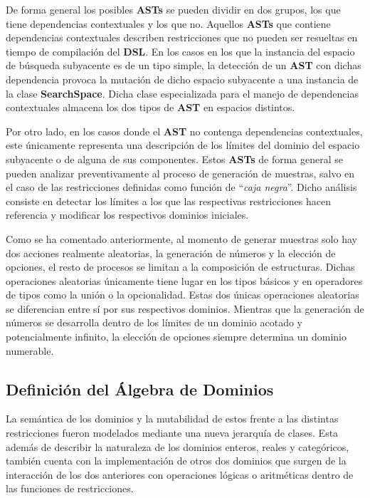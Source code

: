 De forma general los posibles {\bf ASTs} se pueden dividir en dos grupos, los que tiene dependencias contextuales
y los que no. Aquellos {\bf ASTs} que contiene dependencias contextuales describen restricciones que no pueden ser
resueltas en tiempo de compilación del {\bf DSL}. En los casos en los que la instancia del espacio de búsqueda subyacente
es de un tipo simple, la detección de un {\bf AST }con dichas dependencia provoca la mutación de dicho espacio subyacente
a una instancia de la clase {\bf SearchSpace}. Dicha clase especializada para el manejo de dependencias contextuales
almacena los dos tipos de {\bf AST} en espacios distintos.

Por otro lado, en los casos donde el {\bf AST} no contenga dependencias contextuales, este únicamente representa una
descripción de los límites del dominio del espacio subyacente o de alguna de sus componentes. Estos {\bf ASTs} de forma
general se pueden analizar preventivamente al proceso de generación de muestras, salvo en el caso de las restricciones
definidas como función de ``{\it caja negra}''. Dicho análisis consiste en detectar los límites a los que las respectivas
restricciones hacen referencia y modificar los respectivos dominios iniciales.

Como se ha comentado anteriormente, al momento de generar muestras solo hay dos acciones realmente aleatorias, la
generación de números y la elección de opciones, el resto de procesos se limitan a la composición de estructuras.
Dichas operaciones aleatorias únicamente tiene lugar en los tipos básicos y en operadores de tipos como la unión o
la opcionalidad. Estas dos únicas operaciones aleatorias se diferencian entre sí por sus respectivos dominios. Mientras
que la generación de números se desarrolla dentro de los límites de un dominio acotado y potencialmente infinito, 
la elección de opciones siempre determina un dominio numerable.

\subsection{Definición del Álgebra de Dominios}

La semántica de los dominios y la mutabilidad de estos frente a las distintas restricciones fueron modelados mediante una
nueva jerarquía de clases. Esta además de describir la naturaleza de los dominios enteros, reales y categóricos,
también cuenta con la implementación de otros dos dominios que surgen de la interacción de los dos anteriores con operaciones
lógicas o aritméticas dentro de las funciones de restricciones.

